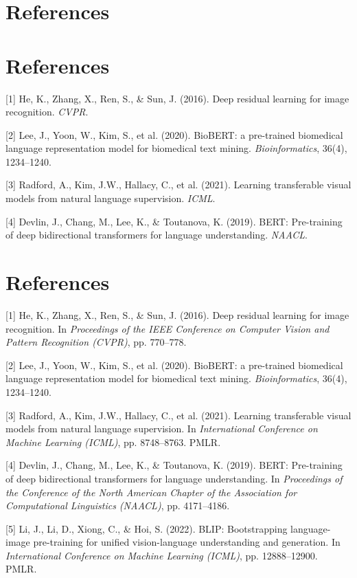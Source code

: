 \documentclass{article}
\begin{document}
\section*{References}
{\small
\section*{References}
{\small

[1] He, K., Zhang, X., Ren, S., \& Sun, J. (2016). Deep residual learning for image recognition. \textit{CVPR}.

[2] Lee, J., Yoon, W., Kim, S., et al. (2020). BioBERT: a pre-trained biomedical language representation model for biomedical text mining. \textit{Bioinformatics}, 36(4), 1234--1240.

[3] Radford, A., Kim, J.W., Hallacy, C., et al. (2021). Learning transferable visual models from natural language supervision. \textit{ICML}.

[4] Devlin, J., Chang, M., Lee, K., \& Toutanova, K. (2019). BERT: Pre-training of deep bidirectional transformers for language understanding. \textit{NAACL}.

\section*{References}
{\small

[1] He, K., Zhang, X., Ren, S., \& Sun, J. (2016). Deep residual learning for image recognition. In \textit{Proceedings of the IEEE Conference on Computer Vision and Pattern Recognition (CVPR)}, pp. 770--778.

[2] Lee, J., Yoon, W., Kim, S., et al. (2020). BioBERT: a pre-trained biomedical language representation model for biomedical text mining. \textit{Bioinformatics}, 36(4), 1234--1240.

[3] Radford, A., Kim, J.W., Hallacy, C., et al. (2021). Learning transferable visual models from natural language supervision. In \textit{International Conference on Machine Learning (ICML)}, pp. 8748--8763. PMLR.

[4] Devlin, J., Chang, M., Lee, K., \& Toutanova, K. (2019). BERT: Pre-training of deep bidirectional transformers for language understanding. In \textit{Proceedings of the Conference of the North American Chapter of the Association for Computational Linguistics (NAACL)}, pp. 4171--4186.

[5] Li, J., Li, D., Xiong, C., \& Hoi, S. (2022). BLIP: Bootstrapping language-image pre-training for unified vision-language understanding and generation. In \textit{International Conference on Machine Learning (ICML)}, pp. 12888--12900. PMLR.

}}}
\end{document}

